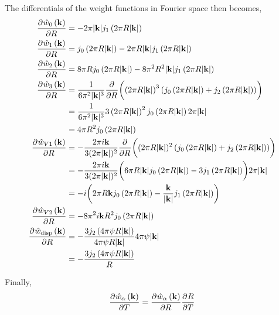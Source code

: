 \documentclass[12pt, letterpaper]{article}
\newcommand*{\pd}[3][]{\frac{\partial^{#1}#2}{\partial{#3}^{#1}}}%
\newcommand*{\lb}{\ensuremath{\left(}}
\newcommand*{\rb}{\ensuremath{\right)}}
\newcommand{\disp}{\ensuremath{\text{disp}}\xspace}
\begin{document}
The differentials of the weight functions in Fourier space then becomes,
\begin{align}
  \label{eq:weight_functions_fourier_diff}
  \pd{\hat{w}_0 \lb \mathbf{k}\rb}{R} &= - 2 \pi |\mathbf{k}| j_1\lb 2 \pi R |\mathbf{k}| \rb  \\
  \pd{\hat{w}_1 \lb \mathbf{k}\rb}{R} &= j_0\lb 2 \pi R |\mathbf{k}| \rb - 2 \pi R |\mathbf{k}| j_1\lb 2 \pi R |\mathbf{k}| \rb \\
  \pd{\hat{w}_2 \lb \mathbf{k}\rb}{R} &= 8 \pi R j_0\lb 2 \pi R |\mathbf{k}| \rb - 8 \pi^2 R^2 |\mathbf{k}| j_1\lb 2 \pi R |\mathbf{k}| \rb  \\
  \pd{\hat{w}_3 \lb \mathbf{k}\rb}{R}  &=  \frac{1}{6 \pi^2 |\mathbf{k}|^3} \pd{}{R}\biggl( \lb 2 \pi R |\mathbf{k}|\rb ^3 \lb j_0\lb 2 \pi R |\mathbf{k}| \rb + j_2\lb 2 \pi R |\mathbf{k}| \rb \rb \biggr)  \nonumber \\
                                      &=  \frac{1}{6 \pi^2 |\mathbf{k}|^3} 3 \lb 2 \pi R |\mathbf{k}|\rb ^2  j_0\lb 2 \pi R |\mathbf{k}| \rb 2 \pi |\mathbf{k}| \nonumber  \\
                                      &=  4 \pi R^2 j_0\lb 2 \pi R |\mathbf{k}| \rb  \\
  \pd{\hat{w}_{V1} \lb \mathbf{k}\rb}{R} &= - \frac{2 \pi i \mathbf{k}}{3 (2 \pi |\mathbf{k}|)^2}  \pd{}{R}\biggl( (2 \pi R |\mathbf{k}|)^2 \lb j_0\lb 2 \pi R |\mathbf{k}| \rb + j_2\lb 2 \pi R |\mathbf{k}| \rb \rb \biggr) \nonumber \\
                                      &= - \frac{2 \pi i \mathbf{k}}{3 (2 \pi |\mathbf{k}|)^2} \biggl( 6 \pi R |\mathbf{k}| j_0\lb 2 \pi R |\mathbf{k}| \rb - 3 j_1\lb 2 \pi R |\mathbf{k}| \rb \biggr) 2 \pi |\mathbf{k}|  \nonumber \\
   &= - i \biggl( 2 \pi R \mathbf{k} j_0\lb 2 \pi R |\mathbf{k}| \rb - \frac{\mathbf{k}}{|\mathbf{k}|} j_1\lb 2 \pi R |\mathbf{k}| \rb \biggr)  \\
  \pd{\hat{w}_{V2} \lb \mathbf{k}\rb}{R} &= - 8 \pi^2 i \mathbf{k} R^2 j_0\lb 2 \pi R |\mathbf{k}| \rb  \\
  \pd{\hat{w}_{\disp} \lb \mathbf{k}\rb}{R} &= -\frac{3 j_2\lb 4 \pi \psi R |\mathbf{k}| \rb}{4 \pi \psi R |\mathbf{k}|} 4 \pi \psi |\mathbf{k}| \nonumber \\
                                      &= -\frac{3 j_2\lb 4 \pi \psi R |\mathbf{k}| \rb}{R}
\end{align}

Finally,
\begin{equation}
  \pd{\hat{w}_\alpha \lb \mathbf{k}\rb}{T} = \pd{\hat{w}_\alpha \lb \mathbf{k}\rb}{R} \pd{R}{T}
\end{equation}
\end{document}
